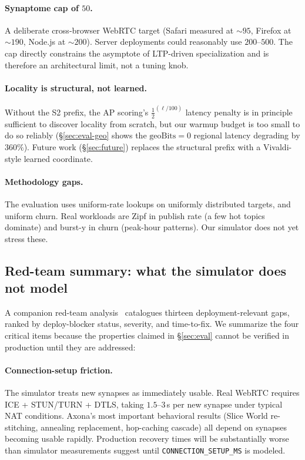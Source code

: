 \documentclass[conference]{IEEEtran}
\newcommand{\axona}{Axona\xspace}
\begin{document}
\paragraph{Synaptome cap of $50$.} A deliberate cross-browser WebRTC
target (Safari measured at $\sim\!95$, Firefox at $\sim\!190$, Node.js
at $\sim\!200$). Server deployments could reasonably use $200$--$500$.
The cap directly constrains the asymptote of LTP-driven specialization
and is therefore an architectural limit, not a tuning knob.

\paragraph{Locality is structural, not learned.} Without the S2 prefix,
the AP scoring's $\frac{1}{2}^{(\ell/100)}$ latency penalty is in
principle sufficient to discover locality from scratch, but our warmup
budget is too small to do so reliably (\S\ref{sec:eval-geo} shows the
$\mathrm{geoBits} = 0$ regional latency degrading by $360\%$). Future
work (\S\ref{sec:future}) replaces the structural prefix with a
Vivaldi-style learned coordinate.

\paragraph{Methodology gaps.} The evaluation uses uniform-rate lookups
on uniformly distributed targets, and uniform churn. Real workloads
are Zipf in publish rate (a few hot topics dominate) and burst-y in
churn (peak-hour patterns). Our simulator does not yet stress these.

\subsection{Red-team summary: what the simulator does not model}
\label{sec:redteam}

A companion red-team analysis~\cite{nh1redteam2026} catalogues thirteen
deployment-relevant gaps, ranked by deploy-blocker status, severity,
and time-to-fix. We summarize the four critical items because the
properties claimed in \S\ref{sec:eval} cannot be verified in production
until they are addressed:

\paragraph{Connection-setup friction.} The simulator treats new
synapses as immediately usable. Real WebRTC requires ICE + STUN/TURN
+ DTLS, taking $1.5$--$3$\,s per new synapse under typical NAT
conditions. \axona's most important behavioral results
(Slice World re-stitching, annealing replacement, hop-caching
cascade) all depend on synapses becoming usable rapidly. Production
recovery times will be substantially worse than simulator measurements
suggest until \texttt{CONNECTION\_SETUP\_MS} is modeled.
\end{document}
